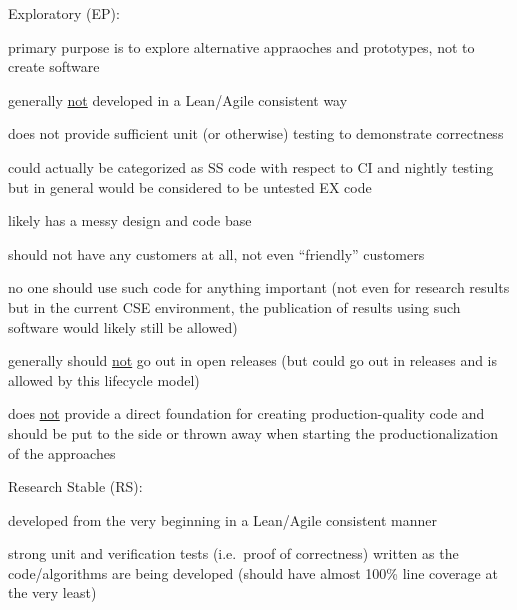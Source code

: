 \documentclass[11pt]{SANDreport}
\begin{document}
\begin{compactenum}

{}\item Exploratory (EP):

\begin{compactitem}

{}\item primary purpose is to explore alternative appraoches and
prototypes, not to create software

{}\item generally {}\underline{not} developed in a Lean/Agile
consistent way

{}\item does not provide sufficient unit (or otherwise) testing to
demonstrate correctness

{}\item could actually be categorized as SS code with respect to CI
and nightly testing but in general would be considered to be untested
EX code

{}\item likely has a messy design and code base

{}\item should not have any customers at all, not even ``friendly''
customers

{}\item no one should use such code for anything important (not even
for research results but in the current CSE environment, the
publication of results using such software would likely still be
allowed)

{}\item generally should {}\underline{not} go out in open releases
(but could go out in releases and is allowed by this lifecycle model)

{}\item does {}\underline{not} provide a direct foundation for
creating production-quality code and should be put to the side or
thrown away when starting the productionalization of the approaches

\end{compactitem}

{}\item Research Stable (RS):

\begin{compactitem}

{}\item developed from the very beginning in a Lean/Agile consistent
manner

{}\item strong unit and verification tests (i.e.\ proof of
correctness) written as the code/algorithms are being developed
(should have almost 100\% line coverage at the very least)


\end{compactitem}
\end{compactenum}
\end{document}
